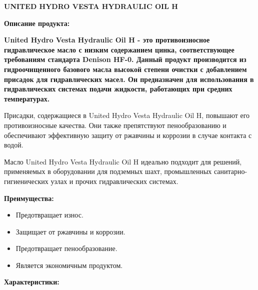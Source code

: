 \documentclass[12pt,a4paper]{article}
\begin{document}
\begin{spacing}{2.5}
{\textbf{\fontsize{20pt}{30pt}\selectfont UNITED HYDRO VESTA HYDRAULIC OIL H}}
\end{spacing}

\begin{spacing}{2.5}
{\textbf{\fontsize{14pt}{4pt}\selectfont Описание продукта:}}
\end{spacing}
{\textbf{United Hydro Vesta Hydraulic Oil H - это противоизносное гидравлическое масло с низким содержанием цинка, соответствующее требованиям стандарта Denison HF-0. Данный продукт производится из гидроочищенного базового масла высокой степени очистки с добавлением присадок для гидравлических масел. Он предназначен для использования в гидравлических системах подачи жидкости, работающих при средних температурах.}

Присадки, содержащиеся в United Hydro Vesta Hydraulic Oil H, повышают его противоизносные качества. Они также препятствуют пенообразованию и обеспечивают эффективную защиту от ржавчины и коррозии в случае контакта с водой.

Масло United Hydro Vesta Hydraulic Oil H идеально подходит для решений, применяемых в оборудовании для подземных шахт, промышленных санитарно-гигиенических узлах и прочих гидравлических системах. 

\bigskip
{\textbf{\fontsize{14pt}{10pt}\selectfont Преимущества:}}

\begin{itemize}[itemsep=1.4pt]

\item Предотвращает износ.
\item Защищает от ржавчины и коррозии.
\item Предотвращает пенообразование.
\item Является экономичным продуктом.
 
\end{itemize}

\begin{spacing}{1}
{\textbf{\fontsize{14pt}{4pt}\selectfont Характеристики:}}
\end{spacing}

}
\end{document}
